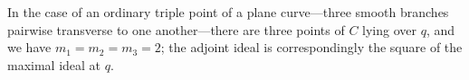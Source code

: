 \begin{example}
In the case of an ordinary triple point of a plane curve---three smooth branches pairwise transverse to one another---there are three points of $C$ lying over $q$, and we have $m_1=m_2=m_3= 2$; the adjoint ideal is correspondingly 
 the square of the maximal ideal at $q$. 
\end{example}



